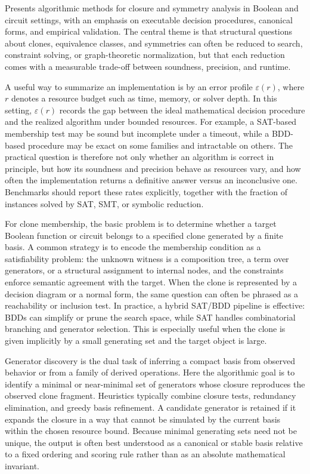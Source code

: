 Presents algorithmic methods for closure and symmetry analysis in Boolean and circuit settings, with an emphasis on executable decision procedures, canonical forms, and empirical validation. The central theme is that structural questions about clones, equivalence classes, and symmetries can often be reduced to search, constraint solving, or graph-theoretic normalization, but that each reduction comes with a measurable trade-off between soundness, precision, and runtime.

A useful way to summarize an implementation is by an error profile \(\varepsilon(r)\), where \(r\) denotes a resource budget such as time, memory, or solver depth. In this setting, \(\varepsilon(r)\) records the gap between the ideal mathematical decision procedure and the realized algorithm under bounded resources. For example, a SAT-based membership test may be sound but incomplete under a timeout, while a BDD-based procedure may be exact on some families and intractable on others. The practical question is therefore not only whether an algorithm is correct in principle, but how its soundness and precision behave as resources vary, and how often the implementation returns a definitive answer versus an inconclusive one. Benchmarks should report these rates explicitly, together with the fraction of instances solved by SAT, SMT, or symbolic reduction.

For clone membership, the basic problem is to determine whether a target Boolean function or circuit belongs to a specified clone generated by a finite basis. A common strategy is to encode the membership condition as a satisfiability problem: the unknown witness is a composition tree, a term over generators, or a structural assignment to internal nodes, and the constraints enforce semantic agreement with the target. When the clone is represented by a decision diagram or a normal form, the same question can often be phrased as a reachability or inclusion test. In practice, a hybrid SAT/BDD pipeline is effective: BDDs can simplify or prune the search space, while SAT handles combinatorial branching and generator selection. This is especially useful when the clone is given implicitly by a small generating set and the target object is large.

Generator discovery is the dual task of inferring a compact basis from observed behavior or from a family of derived operations. Here the algorithmic goal is to identify a minimal or near-minimal set of generators whose closure reproduces the observed clone fragment. Heuristics typically combine closure tests, redundancy elimination, and greedy basis refinement. A candidate generator is retained if it expands the closure in a way that cannot be simulated by the current basis within the chosen resource bound. Because minimal generating sets need not be unique, the output is often best understood as a canonical or stable basis relative to a fixed ordering and scoring rule rather than as an absolute mathematical invariant.

